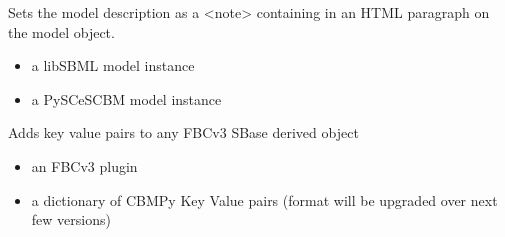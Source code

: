 \documentclass[letterpaper,10pt,english]{sphinxmanual}
\begin{document}

\begin{fulllineitems}
\label{\detokenize{modules_doc:cbmpy.CBXML.sbml_setDescription}}
\pysigstartsignatures
{}
\pysigstopsignatures
\sphinxAtStartPar
Sets the model description as a \textless{}note\textgreater{} containing  in an HTML paragraph on the model object.
\begin{itemize}
\item {} 
\sphinxAtStartPar
{} a libSBML model instance

\item {} 
\sphinxAtStartPar
{} a PySCeSCBM model instance

\end{itemize}

\end{fulllineitems}


\begin{fulllineitems}
\label{\detokenize{modules_doc:cbmpy.CBXML.sbml_setFBCv3KeyValuePairs}}
\pysigstartsignatures
{}
\pysigstopsignatures
\sphinxAtStartPar
Adds key value pairs to any FBCv3 SBase derived object
\begin{itemize}
\item {} 
\sphinxAtStartPar
{} an FBCv3 plugin

\item {} 
\sphinxAtStartPar
{} a dictionary of CBMPy Key Value pairs (format will be upgraded over next few versions)

\end{itemize}

\end{fulllineitems}

\end{document}
